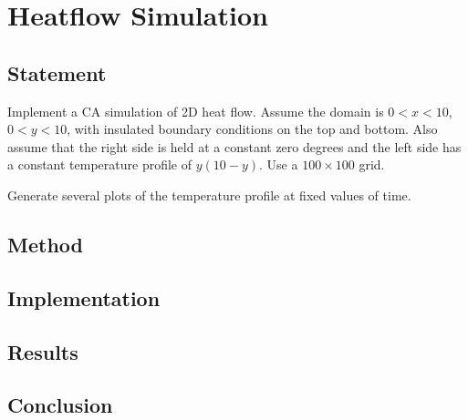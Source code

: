\section{Heatflow Simulation}

\subsection{Statement}
Implement a CA simulation of 2D heat flow.
Assume the domain is $0 < x < 10$, $0 < y < 10$, with insulated boundary conditions on the top and bottom.
Also assume that the right side is held at a constant zero degrees and the left side has a constant temperature profile of $y(10 - y)$.
Use a $100 \times 100$ grid.

Generate several plots of the temperature profile at fixed values of time.

\subsection{Method}
\subsection{Implementation}
\subsection{Results}
\subsection{Conclusion}
